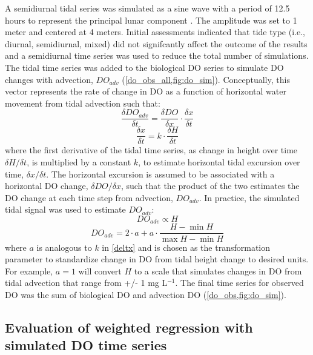 \documentclass[letterpaper,12pt,oneside]{article}\usepackage[]{graphicx}\usepackage[]{color}
\begin{document}
A semidiurnal tidal series was simulated as a sine wave with a period of 12.5 hours to represent the principal lunar component \citep{Foreman89}.  The amplitude was set to 1 meter and centered  at 4 meters.  Initial assessments indicated that tide type (i.e., diurnal, semidiurnal, mixed) did not signifcantly affect the outcome of the results and a semidiurnal time series was used to reduce the total number of simulations.  The tidal time series was added to the biological \ac{DO} series to simulate \ac{DO} changes with advection, $DO_{adv}$ (\cref{do_obs_all,fig:do_sim}). Conceptually, this vector represents the rate of change in \ac{DO} as a function of horizontal water movement from tidal advection such that:
\begin{equation} \label{deltdo}
\frac{\delta DO_{adv}}{\delta t} = \frac{\delta DO}{\delta x} \cdot \frac{\delta x}{\delta t}
\end{equation}
\begin{equation} \label{deltx}
\frac{\delta x}{\delta t} = k \cdot \frac{\delta H}{\delta t}
\end{equation}
where the first derivative of the tidal time series, as change in height over time $\delta H / \delta t$, is multiplied by a constant $k$, to estimate horizontal tidal excursion over time, $\delta x / \delta t$.  The horizontal excursion is assumed to be associated with a horizontal \ac{DO} change, $\delta DO / \delta x$, such that the product of the two estimates the \ac{DO} change at each time step from advection, $DO_{adv}$. In practice, the simulated tidal signal was used to estimate $DO_{adv}$:
\begin{equation} \label{do_advp}
DO_{adv} \propto H
\end{equation}
\begin{equation} \label{do_adv}
DO_{adv} = 2\cdot a + a \cdot \frac{H- \min H}{\max H - \min H}
\end{equation}
where $a$ is analogous to $k$ in \cref{deltx} and is chosen as the transformation parameter to standardize change in \ac{DO} from tidal height change to desired units.  For example, $a = 1$ will convert $H$ to a scale that simulates changes in \ac{DO} from tidal advection that range from +/- 1 mg L$^{-1}$.  The final time series for observed \ac{DO} was the sum of biological \ac{DO} and advection \ac{DO} (\cref{do_obs,fig:do_sim}).

\subsection{Evaluation of weighted regression with simulated \ac{DO} time series}
\end{document}
